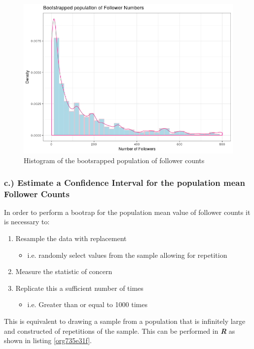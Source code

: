 \documentclass[11pt]{article}
\begin{document}
\begin{figure}[htbp]
\centering
\includegraphics[width=12cm]{./Figures/BootStrap_Pop.png}
\caption{\label{fig:orgbdf83e3}Histogram of the bootsrapped population of follower counts}
\end{figure}

\subsubsection{c.) Estimate a Confidence Interval for the population mean Follower Counts}
\label{sec:org12a0da2}
In order to perform a bootrap for the population mean value of follower counts it is necessary to:

\begin{enumerate}
\item Resample the data with replacement
\begin{itemize}
\item i.e. randomly select values from the sample allowing for repetition
\end{itemize}
\item Measure the statistic of concern
\item Replicate this a sufficient number of times
\begin{itemize}
\item i.e. Greater than or equal to 1000 times \cite[Ch. 5]{davison1997}
\end{itemize}
\end{enumerate}

This is equivalent to drawing a sample from a population that is infinitely large and constructed of repetitions of the sample. This can be performed in \textbf{\emph{R}} as shown in listing \ref{org735e31f}.
\end{document}

